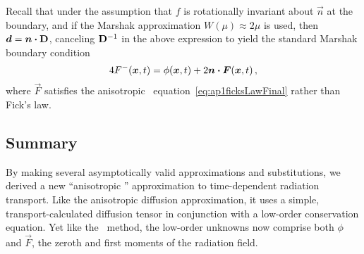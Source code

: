 Recall that under the assumption that $f$ is rotationally invariant about
$\vec{n}$ at the boundary, and if the Marshak approximation $W(\mu) \approx
2\mu$ is used, then $\bm{d} = \bm{n} \bm{\cdot} \mathbf{D}$, canceling $\mathbf{D}^{-1}$ in
the above expression to yield the standard Marshak boundary condition
\begin{equation*}
  4 F^-(\bm{x},t) =  \phi(\bm{x},t) + 2 \bm{n} \bm{\cdot} \bm{F}(\bm{x},t)\,,
\end{equation*}
where $\vec{F}$ satisfies the anisotropic \Pone\
equation~\eqref{eq:ap1ficksLawFinal} rather than Fick's law.


\subsection{Summary}

By making several asymptotically valid approximations and substitutions, we
derived a new ``anisotropic \Pone'' approximation to time-dependent radiation
transport. Like the anisotropic diffusion approximation, it uses
a simple, transport-calculated diffusion tensor in conjunction with a low-order
conservation equation. Yet like the \Pone\ method, the low-order unknowns now
comprise both $\phi$ and $\vec{F}$, the zeroth and first moments of the
radiation field.

